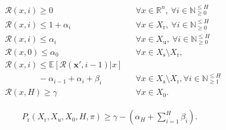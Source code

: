 \documentclass[10pt,a4paper]{amsart}
\newcommand{\Pfin}{P_{\reach}(X_{\reach}, X_u, X_0, \hor, \pi)}
\newcommand{\RA}{\mathcal{R}}
\newcommand{\hor}{H}
\newcommand{\naturals}{\mathbb{N}}
\newcommand{\px}{\mathbf{x}}
\newcommand{\reach}{\mathrm{r}}
\newcommand{\safe}{\mathrm{s}}
\newcommand{\unsafe}{\mathrm{u}}
\begin{document}
        \begin{align}
            \!\!\!\!\!&\RA(x, i) \geq 0 && \forall x \in \mathbb{R}^n, \ \forall i \in \naturals^{\leq \hor}_{\geq 0} \label{eq:nonneg-tv} \\
            &\RA(x, i) \leq 1 + \alpha_i && \forall x \in X_\reach, \ \forall i \in \naturals^{\leq \hor}_{\geq 0} \label{eq:reach-tv} \\
            &\RA(x, i) \leq \alpha_i && \forall x \in X_\unsafe, \ \forall i \in \naturals^{\leq \hor}_{\geq 0} \label{eq:nsafe-tv} \\
            &\RA(x, 0) \leq \alpha_0 && \forall x \in X_\safe\setminus X_\reach,  \label{eq:initial-nsafe-tv} \\
            &\RA(x, i) \leq \mathbb{E}[\RA(\px', i-1) | x ]  && \nonumber \\
            &  \qquad \qquad  - \alpha_{i-1} + \alpha_i + \beta_i 
                 && \forall x \in X_\safe \! \setminus \! X_\reach,  \forall i \in \naturals^{\leq \hor}_{\geq 1} \label{eq:exp-tv}\\
            &\RA(x, \hor) \geq \gamma && \forall x \in X_0. \label{eq:Vinitial_ss}
        \end{align}

    \begin{align}
        \label{eq: probability bound for TV reach-avoid}
        \Pfin \geq \gamma - \left( \alpha_\hor + \sum_{i=1}^{ \hor} \beta_i
        \right ).
    \end{align}  
\end{document}
